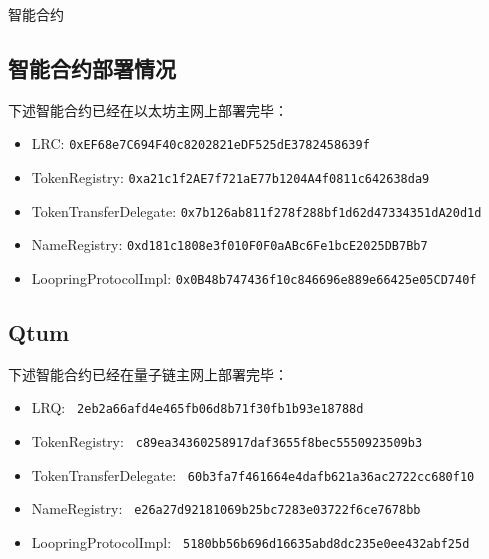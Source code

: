 \documentclass[UTF8]{ctexart}
\makeatletter
\newenvironment{figurehere}
 {\def\@captype{figure}}
 {}
\makeatother
\begin{document}
\begin{appendices}
\begin{center}
\begin{figurehere}
\caption{智能合约}
\label{fig:smartcontracts}
\end{figurehere}
\end{center}

\subsection{智能合约部署情况}

下述智能合约已经在以太坊主网上部署完毕：
\begin{itemize}
\item LRC: \verb|0xEF68e7C694F40c8202821eDF525dE3782458639f|
\item TokenRegistry: \verb|0xa21c1f2AE7f721aE77b1204A4f0811c642638da9|
\item TokenTransferDelegate: \verb|0x7b126ab811f278f288bf1d62d47334351dA20d1d|
\item NameRegistry: \verb|0xd181c1808e3f010F0F0aABc6Fe1bcE2025DB7Bb7|
\item LoopringProtocolImpl: \verb|0x0B48b747436f10c846696e889e66425e05CD740f|
\end{itemize}

\subsection{Qtum}
下述智能合约已经在量子链主网上部署完毕：
\begin{itemize}
\item LRQ: \verb| 2eb2a66afd4e465fb06d8b71f30fb1b93e18788d |
\item TokenRegistry: \verb| c89ea34360258917daf3655f8bec5550923509b3 |
\item TokenTransferDelegate: \verb| 60b3fa7f461664e4dafb621a36ac2722cc680f10 |
\item NameRegistry: \verb| e26a27d92181069b25bc7283e03722f6ce7678bb |
\item LoopringProtocolImpl: \verb| 5180bb56b696d16635abd8dc235e0ee432abf25d |
\end{itemize}

\end{appendices}
\end{document}
